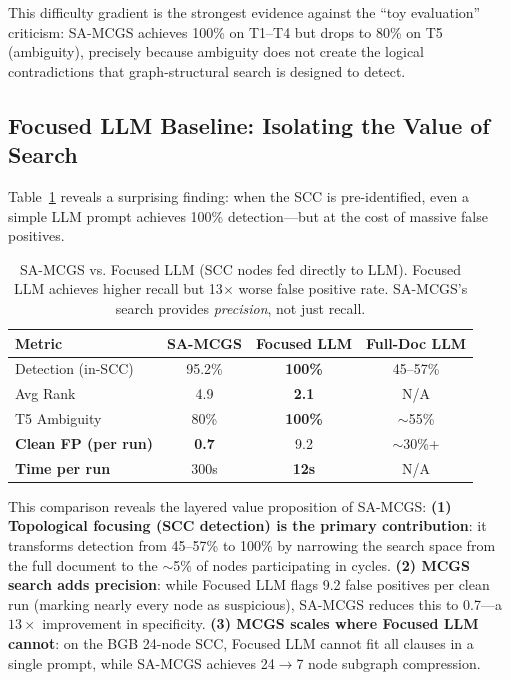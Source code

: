 \documentclass{article}
\begin{document}
This difficulty gradient is the strongest evidence against the ``toy evaluation'' criticism: SA-MCGS achieves 100\% on T1--T4 but drops to 80\% on T5 (ambiguity), precisely because ambiguity does not create the logical contradictions that graph-structural search is designed to detect.

\subsection{Focused LLM Baseline: Isolating the Value of Search}

Table~\ref{tab:focused} reveals a surprising finding: when the SCC is pre-identified, even a simple LLM prompt achieves 100\% detection---but at the cost of massive false positives.

\begin{table}[t]
\caption{SA-MCGS vs. Focused LLM (SCC nodes fed directly to LLM). Focused LLM achieves higher recall but 13$\times$ worse false positive rate. SA-MCGS's search provides \emph{precision}, not just recall.}
\label{tab:focused}
\centering
\small
\begin{tabular}{lccc}
\toprule
\textbf{Metric} & \textbf{SA-MCGS} & \textbf{Focused LLM} & \textbf{Full-Doc LLM} \\
\midrule
Detection (in-SCC) & 95.2\% & \textbf{100\%} & 45--57\% \\
Avg Rank & 4.9 & \textbf{2.1} & N/A \\
T5 Ambiguity & 80\% & \textbf{100\%} & $\sim$55\% \\
\midrule
\textbf{Clean FP (per run)} & \textbf{0.7} & 9.2 & $\sim$30\%+ \\
\textbf{Time per run} & 300s & \textbf{12s} & N/A \\
\bottomrule
\end{tabular}
\end{table}

This comparison reveals the layered value proposition of SA-MCGS:
\textbf{(1) Topological focusing (SCC detection) is the primary contribution}: it transforms detection from 45--57\% to 100\% by narrowing the search space from the full document to the $\sim$5\% of nodes participating in cycles.
\textbf{(2) MCGS search adds precision}: while Focused LLM flags 9.2 false positives per clean run (marking nearly every node as suspicious), SA-MCGS reduces this to 0.7---a $13\times$ improvement in specificity.
\textbf{(3) MCGS scales where Focused LLM cannot}: on the BGB 24-node SCC, Focused LLM cannot fit all clauses in a single prompt, while SA-MCGS achieves 24$\to$7 node subgraph compression.
\end{document}
